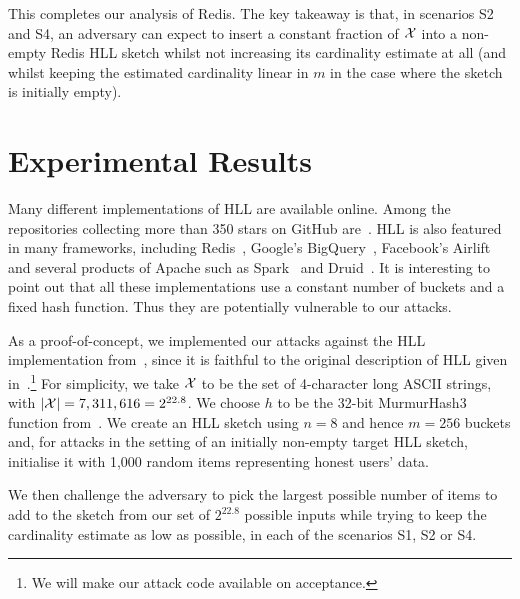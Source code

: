 \documentclass{article}
\begin{document}
This completes our analysis of Redis. The key takeaway is that, in scenarios S2 and S4, an adversary can expect to insert a constant fraction of ${\cal X}$ into a non-empty Redis HLL sketch whilst not increasing its cardinality estimate at all (and whilst keeping the estimated cardinality linear in $m$ in the case where the sketch is initially empty).


\section{Experimental Results}\label{sec:exp}
Many different implementations of HLL are available online. Among the repositories collecting more than 350 stars on GitHub are~\cite{clahll,datasketch}. HLL is also featured in many frameworks, including Redis~\cite{redis}, Google's BigQuery~\cite{bigquery}, Facebook's Airlift~\cite{airlift} and several products of Apache such as Spark~\cite{spahll} and Druid~\cite{druhll}. It is interesting to point out that all these implementations use a constant number of buckets and a fixed hash function. Thus they are potentially vulnerable to our attacks.

As a proof-of-concept, we implemented our attacks against the HLL implementation from~\cite{clahll}, since it is faithful to the original description of HLL given in~\cite{hll}.\footnote{We will make our attack code available on acceptance.}
For simplicity, we take ${\cal X}$ to be the set of 4-character long ASCII strings, with $\lvert {\cal X} \rvert = 7,311,616= 2^{22.8}$. We choose $h$ to be the 32-bit MurmurHash3 function from~\cite{murmur3code}.
We create an HLL sketch using $n=8$ and hence $m=256$ buckets and, for attacks in the setting of an initially non-empty target HLL sketch, initialise it with 1,000 random items representing honest users' data.

We then challenge the adversary to pick the largest possible number of items to add to the sketch from our set of  $2^{22.8}$ possible inputs while trying to keep the cardinality estimate as low as possible, in each of the scenarios S1, S2 or S4. 
\end{document}
